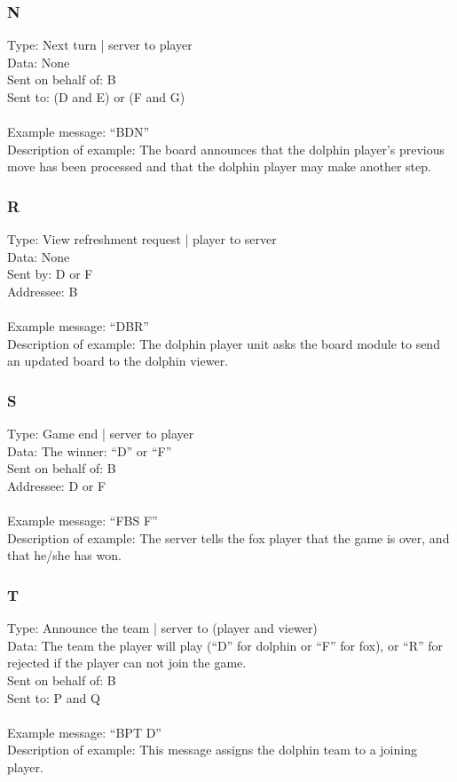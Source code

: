 \documentclass[a4paper,twoside,11pt]{book}
\begin{document}
\subsubsection{N}
Type: Next turn | server to player \\
Data: None \\
Sent on behalf of: B \\
Sent to: (D and E) or (F and G) \\
\\
Example message: ``BDN'' \\
Description of example: The board announces that the dolphin player's previous move has been processed and that the dolphin player may make another step.

\subsubsection{R}
Type: View refreshment request | player to server \\
Data: None \\
Sent by: D or F \\
Addressee: B \\
\\
Example message: ``DBR'' \\
Description of example: The dolphin player unit asks the board module to send an updated board to the dolphin viewer.

\subsubsection{S}
Type: Game end | server to player \\
Data: The winner: ``D'' or ``F''\\
Sent on behalf of: B \\
Addressee: D or F \\
\\
Example message: ``FBS F'' \\
Description of example: The server tells the fox player that the game is over, and that he/she has won.

\subsubsection{T}
Type: Announce the team | server to (player and viewer)\\
Data: The team the player will play (``D'' for dolphin or ``F'' for fox), or ``R'' for rejected if the player can not join the game. \\
Sent on behalf of: B \\
Sent to: P and Q \\
\\
Example message: ``BPT D'' \\
Description of example: This message assigns the dolphin team to a joining player.
\end{document}
